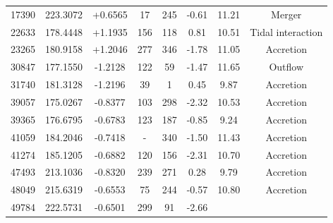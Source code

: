 \documentclass[fleqn,usenatbib]{mnras}
\begin{document}
\begin{table}
\begin{tabular*}{\linewidth}{cccccccc}
17390                     & 223.3072              & +0.6565                & 17                            & 245                         & -0.61%
& 11.21%
& Merger                    \\
22633                     & 178.4448              & +1.1935                & 156                           & 118                         & 0.81%
& 10.51%
& Tidal interaction                    \\
23265                     & 180.9158               & +1.2046                & 277                           & 346                         & -1.78%
& 11.05%
& Accretion                   \\
30847                     & 177.1550             & -1.2128               & 122                           & 59                          & -1.47%
& 11.65%
& Outflow                   \\
31740                     & 181.3128              & -1.2196              & 39                            & 1                           & 0.45%
& 9.87%
& Accretion                    \\
39057                     & 175.0267               & -0.8377             & 103                           & 298                         & -2.32%
& 10.53%
&  Accretion                   \\
39365                     & 176.6795               & -0.6783              & 123                           & 187                         & -0.85%
& 9.24%
& Accretion                    \\
41059                     & 184.2046               & -0.7418               & -                           & 340                         & -1.50%
& 11.43%
& Accretion                    \\
41274                     & 185.1205              & -0.6882               & 120                           & 156                         & -2.31%
& 10.70%
& Accretion                   \\
47493                     & 213.1036             & -0.8320               & 239                           & 271                         & 0.28%
& 9.79%
&  Accretion                   \\
48049                     & 215.6319              & -0.6553               & 75                            & 244                         & -0.57%
& 10.80%
& Accretion                    \\
49784                     & 222.5731              & -0.6501               & 299                           & 91                          & -2.66%

\end{tabular*}
\end{table}
\end{document}
